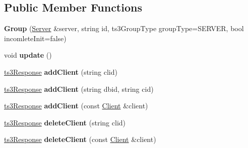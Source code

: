 \subsection*{Public Member Functions}
\begin{DoxyCompactItemize}
\item 
{\bfseries Group} (\hyperlink{class_ts3_api_1_1_server}{Server} \&server, string id, ts3\+Group\+Type group\+Type=S\+E\+R\+V\+ER, bool incomlete\+Init=false)\hypertarget{class_ts3_api_1_1_group_a859bc82d6f410eddcb1b667967ea8c1c}{}\label{class_ts3_api_1_1_group_a859bc82d6f410eddcb1b667967ea8c1c}

\item 
void {\bfseries update} ()\hypertarget{class_ts3_api_1_1_group_a15613fb52efd859858250ddf52ca6599}{}\label{class_ts3_api_1_1_group_a15613fb52efd859858250ddf52ca6599}

\item 
\hyperlink{struct_ts3_api_1_1ts3_response}{ts3\+Response} {\bfseries add\+Client} (string clid)\hypertarget{class_ts3_api_1_1_group_a08b9eb877eb0537f8412cc9e0a2000c6}{}\label{class_ts3_api_1_1_group_a08b9eb877eb0537f8412cc9e0a2000c6}

\item 
\hyperlink{struct_ts3_api_1_1ts3_response}{ts3\+Response} {\bfseries add\+Client} (string dbid, string cid)\hypertarget{class_ts3_api_1_1_group_aef35cfdb68ee7b6f951cafdb407a25a2}{}\label{class_ts3_api_1_1_group_aef35cfdb68ee7b6f951cafdb407a25a2}

\item 
\hyperlink{struct_ts3_api_1_1ts3_response}{ts3\+Response} {\bfseries add\+Client} (const \hyperlink{class_ts3_api_1_1_client}{Client} \&client)\hypertarget{class_ts3_api_1_1_group_ad9ec5a8edcbe9d19ac76c9bc5a95c0a5}{}\label{class_ts3_api_1_1_group_ad9ec5a8edcbe9d19ac76c9bc5a95c0a5}

\item 
\hyperlink{struct_ts3_api_1_1ts3_response}{ts3\+Response} {\bfseries delete\+Client} (string clid)\hypertarget{class_ts3_api_1_1_group_af2fd248456d2eb39477ed0ca393746b2}{}\label{class_ts3_api_1_1_group_af2fd248456d2eb39477ed0ca393746b2}

\item 
\hyperlink{struct_ts3_api_1_1ts3_response}{ts3\+Response} {\bfseries delete\+Client} (const \hyperlink{class_ts3_api_1_1_client}{Client} \&client)\hypertarget{class_ts3_api_1_1_group_a5620f528a41de7b2e91f257c9fccdda9}{}\label{class_ts3_api_1_1_group_a5620f528a41de7b2e91f257c9fccdda9}


\end{DoxyCompactItemize}
